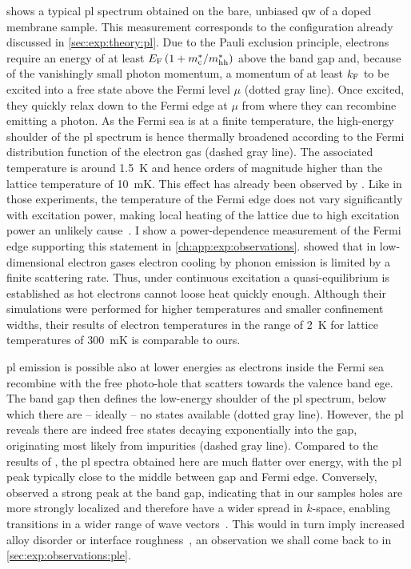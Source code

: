  shows a typical \gls{pl} spectrum obtained on the bare, unbiased \gls{qw} of a doped membrane sample.
This measurement corresponds to the configuration already discussed in \cref{sec:exp:theory:pl}.
Due to the Pauli exclusion principle, electrons require an energy of at least $E_{\mathrm{F}}\left(1 + m_{\mathrm{c}}^\ast/m_{\mathrm{hh}}^\ast\right)$ above the band gap and, because of the vanishingly small photon momentum, a momentum of at least $k_{\mathrm{F}}$ to be excited into a free state above the Fermi level $\mu$ (dotted gray line).
Once excited, they quickly relax down to the Fermi edge at $\mu$ from where they can recombine emitting a photon.
As the Fermi sea is at a finite temperature, the high-energy shoulder of the \gls{pl} spectrum is hence thermally broadened according to the Fermi distribution function of the electron gas (dashed gray line).
The associated temperature is around \qty{1.5}{\kelvin} and hence orders of magnitude higher than the lattice temperature of \qty{10}{\milli\kelvin}.
This effect has already been observed by \citet{Pinczuk1984}.
Like in those experiments, the temperature of the Fermi edge does not vary significantly with excitation power, making local heating of the lattice due to high excitation power an unlikely cause~\cite{Ulbrich1973}.
I show a power-dependence measurement of the Fermi edge supporting this statement in \cref{ch:app:exp:observations}.
\citet{Bockelmann1990} showed that in low-dimensional electron gases electron cooling by phonon emission is limited by a finite scattering rate.
Thus, under continuous excitation a quasi-equilibrium is established as hot electrons cannot loose heat quickly enough.
Although their simulations were performed for higher temperatures and smaller confinement widths, their results of electron temperatures in the range of \qty{2}{\kelvin} for lattice temperatures of \qty{300}{\milli\kelvin} is comparable to ours.

\Gls{pl} emission is possible also at lower energies as electrons inside the Fermi sea recombine with the free photo-hole that scatters towards the valence band ege.
The band gap then defines the low-energy shoulder of the \gls{pl} spectrum, below which there are -- ideally -- no states available (dotted gray line).
However, the \gls{pl} reveals there are indeed free states decaying exponentially into the gap, originating most likely from impurities (dashed gray line).
Compared to the results of \citet{Kamburov2017}, the \gls{pl} spectra obtained here are much flatter over energy, with the \gls{pl} peak typically close to the middle between gap and Fermi edge.
Conversely, \citet{Kamburov2017} observed a strong peak at the band gap,
indicating that in our samples holes are more strongly localized and therefore have a wider spread in $k$-space, enabling transitions in a wider range of wave vectors~\cite{Skolnick1987}.
This would in turn imply increased alloy disorder or interface roughness~\cite{Gabbay2008}, an observation we shall come back to in \cref{sec:exp:observations:ple}.

